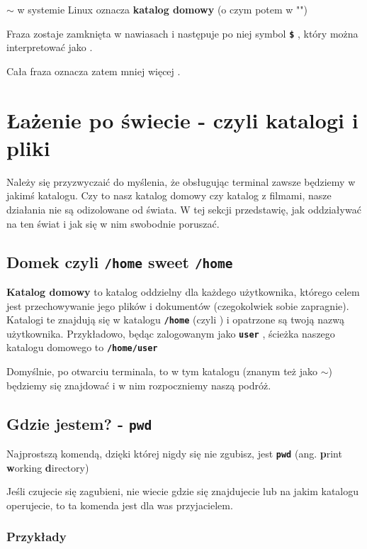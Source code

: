 \documentclass[12pt]{article}
\newcommand{\ttbf}[1]{
    \texttt{\textbf{#1}}
}
\begin{document}
\ttbf{$\sim$} w systemie Linux oznacza \textbf{katalog domowy} (o czym potem w "")

Fraza zostaje zamknięta w nawiasach i następuje po niej symbol \ttbf{\$}, który można interpretować jako .

Cała fraza oznacza zatem mniej więcej .

\section{Łażenie po świecie - czyli katalogi i pliki}

Należy się przyzwyczaić do myślenia, że obsługując terminal zawsze będziemy w jakimś katalogu. Czy to nasz katalog domowy czy katalog z filmami, nasze działania nie są odizolowane od świata. W tej sekcji przedstawię, jak oddziaływać na ten świat i jak się w nim swobodnie poruszać.

\subsection{Domek czyli \texttt{/home} sweet \texttt{/home}}
\label{sec:homedir}

\textbf{Katalog domowy} to katalog oddzielny dla każdego użytkownika, którego celem jest przechowywanie jego plików i dokumentów (czegokolwiek sobie zapragnie). Katalogi te znajdują się w katalogu \ttbf{/home} (czyli ) i opatrzone są twoją nazwą użytkownika. Przykładowo, będąc zalogowanym jako \ttbf{user}, ścieżka naszego katalogu domowego to \ttbf{/home/user}

Domyślnie, po otwarciu terminala, to w tym katalogu (znanym też jako $\sim$) będziemy się znajdować i w nim rozpoczniemy naszą podróż.

\subsection{Gdzie jestem? - \texttt{pwd}}

Najprostszą komendą, dzięki której nigdy się nie zgubisz, jest \ttbf{pwd} (ang. \textbf{p}rint \textbf{w}orking \textbf{d}irectory)

Jeśli czujecie się zagubieni, nie wiecie gdzie się znajdujecie lub na jakim katalogu operujecie, to ta komenda jest dla was przyjacielem.

\subsubsection{Przykłady}
\end{document}
